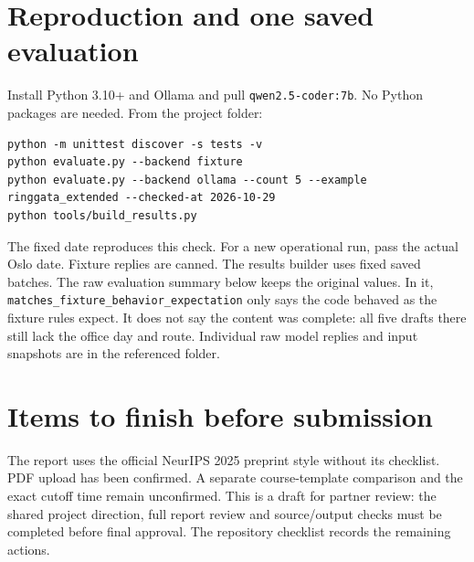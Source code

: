 \documentclass{article}
\begin{document}
\section{Reproduction and one saved evaluation}
Install Python 3.10+ and Ollama and pull \texttt{qwen2.5-coder:7b}. No Python
packages are needed. From the project folder:
\begin{lstlisting}
python -m unittest discover -s tests -v
python evaluate.py --backend fixture
python evaluate.py --backend ollama --count 5 --example ringgata_extended --checked-at 2026-10-29
python tools/build_results.py
\end{lstlisting}
The fixed date reproduces this check. For a new operational run, pass the actual
Oslo date. Fixture replies are canned. The results builder uses fixed saved batches.
The raw evaluation summary below keeps the original values. In it, \texttt{matches\_fixture\_behavior\_expectation} only says the code behaved as the fixture rules expect. It does not say the content was complete: all five drafts there still lack the office day and route. Individual raw model
replies and input snapshots are in the referenced folder.




\section{Items to finish before submission}
The report uses the official NeurIPS 2025 preprint style without its checklist.
PDF upload has been confirmed. A separate course-template comparison and the exact
cutoff time remain unconfirmed. This is a draft for partner review: the shared
project direction, full report review and source/output checks must be completed
before final approval. The repository checklist records the remaining actions.
\end{document}
